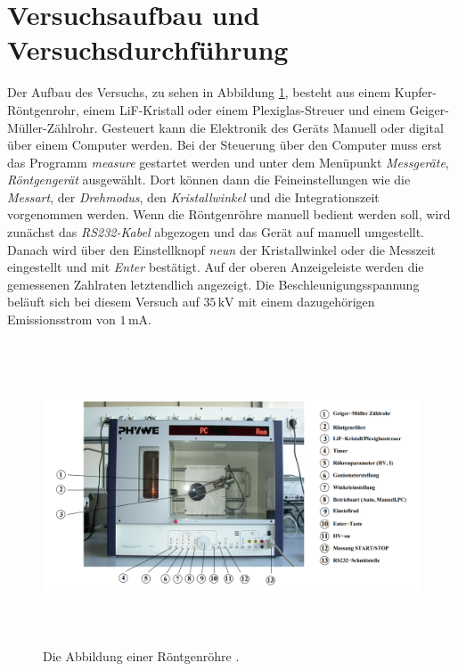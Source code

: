 \section{Versuchsaufbau und Versuchsdurchführung}

\begin{flushleft}
    Der Aufbau des Versuchs, zu sehen in Abbildung \ref{Abbildung2}, besteht aus einem Kupfer-Röntgenrohr, einem LiF-Kristall oder einem Plexiglas-Streuer und einem Geiger-Müller-Zählrohr.
    Gesteuert kann die Elektronik des Geräts Manuell oder digital über einem Computer werden. 
    Bei der Steuerung über den Computer muss erst das Programm \textit{measure} gestartet werden und unter dem Menüpunkt \textit{Messgeräte}, \textit{Röntgengerät} ausgewählt.
    Dort können dann die Feineinstellungen wie die \textit{Messart}, der \textit{Drehmodus}, den \textit{Kristallwinkel} und die Integrationszeit vorgenommen werden.
    Wenn die Röntgenröhre manuell bedient werden soll, wird zunächst das \textit{RS232-Kabel} abgezogen und das Gerät auf manuell umgestellt.
    Danach wird über den Einstellknopf \textit{neun} der Kristallwinkel oder die Messzeit eingestellt und mit \textit{Enter} bestätigt.
    Auf der oberen Anzeigeleiste werden die gemessenen Zahlraten letztendlich angezeigt. 
    Die Beschleunigungsspannung beläuft sich bei diesem Versuch auf $35\,\unit{\kilo\volt}$ mit einem dazugehörigen Emissionsstrom von $1\,\unit{\milli\ampere}$.
\end{flushleft}


\begin{figure}[H] 
    \centering
    \includegraphics[height=90mm]{bilder/Röntgenröhre.png}
    \caption{Die Abbildung einer Röntgenröhre \cite{a1}.\label{Abbildung2} }
\end{figure}


